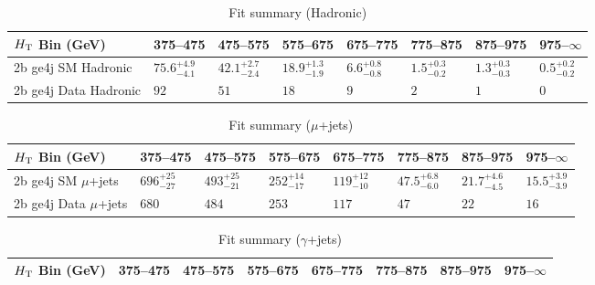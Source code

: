 \documentclass[8pt]{article}
\def\scalht{\mbox{$H_{\rm{T}}$}\xspace}
\newcommand\T{\rule{0pt}{2.6ex}}
\begin{document}
\begin{table}[ht!]
\caption{Fit summary (Hadronic)}
\label{tab:ensemble-summary}
\centering
\begin{tabular}{ llllllll }

\hline
\scalht Bin (GeV)       & 375--475                       & 475--575                       & 575--675                       & 675--775                       & 775--875                       & 875--975                       & 975--$\infty$                  \\ [1.000000ex]
\hline
2b ge4j SM Hadronic\T   & $75.6^{+4.9}_{-4.1}$           & $42.1^{+2.7}_{-2.4}$           & $18.9^{+1.3}_{-1.9}$           & $6.6^{+0.8}_{-0.8}$            & $1.5^{+0.3}_{-0.2}$            & $1.3^{+0.3}_{-0.3}$            & $0.5^{+0.2}_{-0.2}$            \\ 
2b ge4j Data Hadronic\T & $92$                           & $51$                           & $18$                           & $9$                            & $2$                            & $1$                            & $0$                            \\ 
\hline

\end{tabular}
\end{table}
\begin{table}[ht!]
\caption{Fit summary ($\mu$+jets)}
\label{tab:ensemble-summary}
\centering
\begin{tabular}{ llllllll }

\hline
\scalht Bin (GeV)       & 375--475                       & 475--575                       & 575--675                       & 675--775                       & 775--875                       & 875--975                       & 975--$\infty$                  \\ [1.000000ex]
\hline
2b ge4j SM $\mu$+jets\T & $696^{+25}_{-27}$              & $493^{+25}_{-21}$              & $252^{+14}_{-17}$              & $119^{+12}_{-10}$              & $47.5^{+6.8}_{-6.0}$           & $21.7^{+4.6}_{-4.5}$           & $15.5^{+3.9}_{-3.9}$           \\ 
2b ge4j Data $\mu$+jets\T & $680$                          & $484$                          & $253$                          & $117$                          & $47$                           & $22$                           & $16$                           \\ 
\hline

\end{tabular}
\end{table}
\begin{table}[ht!]
\caption{Fit summary ($\gamma$+jets)}
\label{tab:ensemble-summary}
\centering
\begin{tabular}{ llllllll }

\hline
\scalht Bin (GeV)       & 375--475                       & 475--575                       & 575--675                       & 675--775                       & 775--875                       & 875--975                       & 975--$\infty$                  \\ [1.000000ex]
\hline

\end{tabular}
\end{table}
\end{document}
